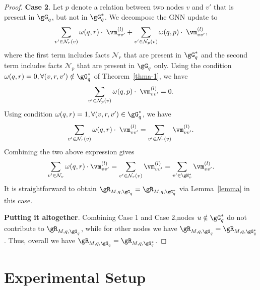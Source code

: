 \begin{proof}
\textbf{Case 2}. Let $p$ denote a relation between two nodes $v$ and $v'$ that is present in $\gG_q$,  but not in $\gG^\ast_q$. We decompose the GNN update to 
\begin{equation}
    \sum_{v' \in \mathcal{N}_r(v) } \omega(q, r) \cdot \; \vm_{vv'}^{(l)} + \sum_{v' \in \mathcal{N}_p(v) } \omega(q, p) \cdot \; \vm_{vv'}^{(l)},
\end{equation}
where the first term includes facts $\mathcal{N}_r$ that are present in $\gG_q^\ast$ and the second term includes facts $\mathcal{N}_p$ that are present in $\gG_q$ only. Using the condition $\omega(q, r)=0 , \forall (v,r,v') \notin \gG_q^\ast$ of Theorem~\ref{thma-1}, we have 
\begin{equation}
    \sum_{v' \in \mathcal{N}_p(v) } \omega(q, p) \cdot \; \vm_{vv'}^{(l)} =0.
\end{equation}
Using condition $\omega(q, r) = 1 , \forall (v,r,v') \in \gG_q^\ast$, we have 
\begin{equation}
 \sum_{v' \in \mathcal{N}_r(v) } \omega(q, r) \cdot \; \vm_{vv'}^{(l)} = \sum_{v' \in \mathcal{N}_r(v) } \vm_{vv'}^{(l)}.
\end{equation}
Combining the two above expression gives 
\begin{equation}
    \sum_{v' \in \mathcal{N}_v } \omega(q, r) \cdot \vm_{vv'}^{(l)}  = \sum_{v' \in \mathcal{N}_r(v) } \vm_{vv'}^{(l)} = \sum_{v' \in \gN^\ast_v }  \vm_{vv'}^{(l)}.
\end{equation}
It is straightforward to obtain $\gR_{M, q, \gG_q} = \gR_{M, q, \gG_q^\ast}$ via Lemma~\ref{lemma} in this case.

\textbf{Putting it altogether}. Combining Case 1 and Case 2,nodes $u \notin \gG_q^\ast$ do not contribute to  $\gR_{M, q, \gG_q}$, while for other nodes we have $\gR_{M, q, \gG_q} = \gR_{M, q, \gG_q^\ast}$. Thus, overall we have $\gR_{M, q, \gG_q} = \gR_{M, q, \gG_q^\ast}$.
\end{proof}

\section{Experimental Setup} \label{app:exp}


